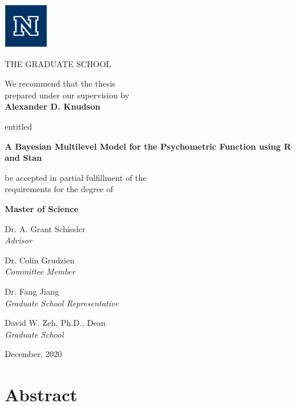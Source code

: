 \documentclass[11pt, oneside, openany]{scrbook}
\begin{document}
\begin{center}

\includegraphics[width=0.75in, height=0.75in]{./figures/unr_logos/University Logo RGB_block_n_blue}

THE GRADUATE SCHOOL

\vspace{1em}
We recommend that the thesis \\
prepared under our supervision by\\

\vspace{1em}
\textbf{Alexander D. Knudson}

\vspace{1em}
entitled

\textbf{A Bayesian Multilevel Model for the Psychometric Function using R and Stan}

\vspace{2em}
be accepted in partial fulfillment of the \\
requirements for the degree of

\vspace{1em}
\textbf{Master of Science}

\vspace{1em}
Dr. A. Grant Schissler \\
\textit{Advisor}

\vspace{1em}
Dr. Colin Grudzien\\
\textit{Committee Member}

\vspace{1em}
Dr. Fang Jiang \\
\textit{Graduate School Representative}

\vspace{1em}
David W. Zeh, Ph.D., Dean \\
\textit{Graduate School}

\vspace{1em}
December, 2020
\end{center}


\newpage
\setcounter{page}{1} %
\section*{Abstract}
\end{document}

